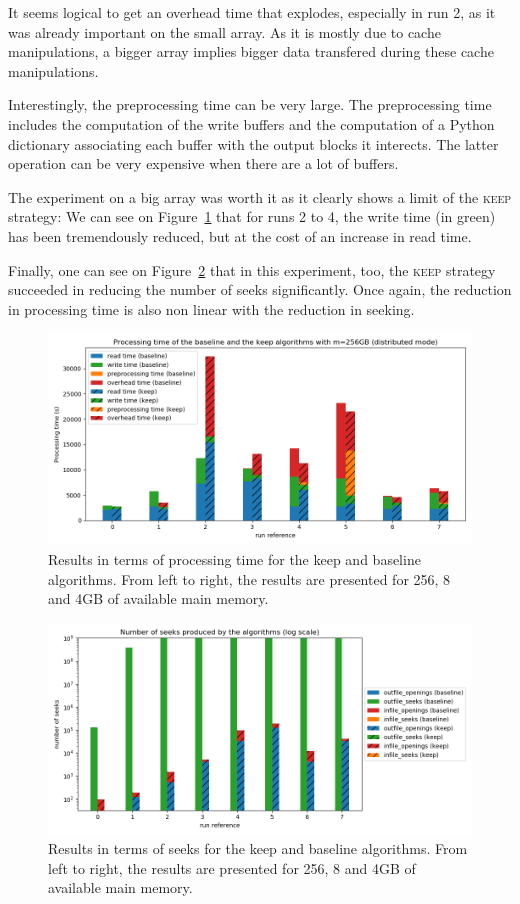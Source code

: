 \documentclass[sigconf, nonacm]{acmart}
\newcommand{\keep}[0]{\textsc{keep}\xspace}
\begin{document}
It seems logical to get an overhead time that explodes, especially in run 2, as
it was already important on the small array. As it is mostly due to cache manipulations,
a bigger array implies bigger data transfered during these cache manipulations.

Interestingly, the preprocessing time can be very large.
The preprocessing time includes the computation of the write buffers and the
computation of a Python dictionary associating each buffer with the output blocks
it interects. The latter operation can be very expensive when there are a lot
of buffers.

The experiment on a big array was worth it as it clearly shows a limit
of the \keep strategy: We can see on Figure~\ref{fig:time_8000} that for runs
2 to 4, the write time (in green) has been tremendously reduced, but at the
cost of an increase in read time.

Finally, one can see on Figure~\ref{fig:seeks_8000} that in this experiment, too,
the \keep strategy succeeded in reducing the number of seeks significantly. Once
again, the reduction in processing time is also non linear with the reduction in
seeking.  

\begin{figure}[h]
  \centering
  \includegraphics[scale=0.36]{./figures/time_8000.png}
  \caption{Results in terms of processing time for the keep and baseline algorithms. From left to right, the results are presented for 256, 8 and 4GB of available main memory.}
  \label{fig:time_8000}
\end{figure}

\begin{figure}[h]
    \centering
    \includegraphics[scale=0.36]{./figures/seeks_8000.png}
    \caption{Results in terms of seeks for the keep and baseline algorithms. From left to right, the results are presented for 256, 8 and 4GB of available main memory.}
    \label{fig:seeks_8000}
\end{figure}
\end{document}
